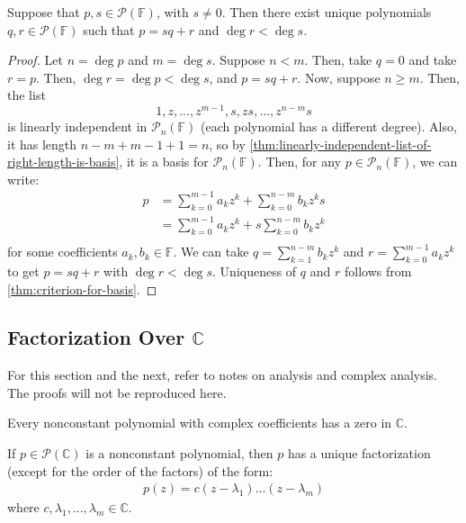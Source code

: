 \documentclass{article}
\begin{document}
\begin{theorem}
  \label{thm:division-algorithm-polynomials}
  Suppose that $p, s \in \mathcal{P}(\mathbb{F})$, with $s \ne
  0$. Then there exist unique polynomials $q, r \in
  \mathcal{P}(\mathbb{F})$ such that $p = sq + r$ and $\deg r < \deg s$.
\end{theorem}
\begin{proof}
  Let $n = \deg p$ and $m = \deg s$.
  Suppose $n < m$. Then, take $q = 0$ and take $r = p$. Then, $\deg r
  = \deg p < \deg s$, and $p = sq + r$.
  Now, suppose $n \ge m$. Then, the list
  $$1,z,...,z^{m-1},s,zs,...,z^{n-m}s$$
  is linearly independent in $\mathcal{P}_n(\mathbb{F})$ (each
  polynomial has a different degree). Also, it has length $n - m + m -
  1 + 1 = n$, so by
  \cref{thm:linearly-independent-list-of-right-length-is-basis}, it is
  a basis for $\mathcal{P}_n(\mathbb{F})$.
  Then, for any $p \in \mathcal{P}_n(\mathbb{F})$, we can write:
  \begin{align*}
    p &= \sum_{k=0}^{m-1} a_k z^k + \sum_{k=0}^{n-m} b_k z^k s \\
      &= \sum_{k=0}^{m-1} a_k z^k + s \sum_{k=0}^{n-m} b_k z^k \\
  \end{align*}
  for some coefficients $a_k, b_k \in \mathbb{F}$. We can take $q =
  \sum_{k=1}^{n-m} b_k z^k$ and $r = \sum_{k=0}^{m-1} a_k z^k$ to get
  $p = sq + r$ with $\deg r < \deg s$. Uniqueness of $q$ and $r$
  follows from \cref{thm:criterion-for-basis}.
\end{proof}

\subsection{Factorization Over $\mathbb{C}$}

For this section and the next, refer to notes on analysis and complex
analysis. The proofs will not be reproduced here.

\begin{theorem}
  \label{thm:fundamental-thm-of-algebra-version-1}
  Every nonconstant polynomial with complex coefficients has a zero in $\mathbb{C}$.
\end{theorem}


\begin{theorem}
  \label{thm:fundamental-thm-of-algebra-version-2}
  If $p \in \mathcal{P}(\mathbb{C})$ is a nonconstant polynomial, then
  $p$ has a unique factorization (except for the order of the factors)
  of the form:
  \begin{align*}
    p(z) = c(z - \lambda_1)...(z - \lambda_m)
  \end{align*}
  where $c,\lambda_1,...,\lambda_m \in \mathbb{C}$.
\end{theorem}
\end{document}
